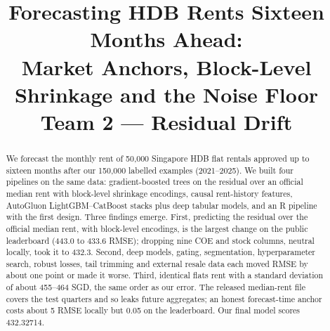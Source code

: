 \documentclass[conference]{IEEEtran}
\newif\ifshowsrc
\newcommand{\src}[1]{\ifshowsrc\textsuperscript{\tiny\color{gray}[#1]}\fi}
\begin{document}
\pagestyle{plain}

\title{Forecasting HDB Rents Sixteen Months Ahead:\\Market Anchors, Block-Level Shrinkage and the Noise Floor\\[2pt]\large Team 2 --- Residual Drift}

\author{}

\maketitle
\thispagestyle{plain}

\begin{abstract}
We forecast the monthly rent of 50,000 Singapore HDB flat rentals approved up to sixteen months after our 150,000 labelled examples (2021--2025). We built four pipelines on the same data: gradient-boosted trees on the residual over an official median rent with block-level shrinkage encodings, causal rent-history features, AutoGluon LightGBM--CatBoost stacks plus deep tabular models, and an R pipeline with the first design. Three findings emerge. First, predicting the residual over the official median rent, with block-level encodings, is the largest change on the public leaderboard (443.0 to 433.6 RMSE); dropping nine COE and stock columns, neutral locally, took it to 432.3. Second, deep models, gating, segmentation, hyperparameter search, robust losses, tail trimming and external resale data each moved RMSE by about one point or made it worse. Third, identical flats rent with a standard deviation of about 455--464 SGD, the same order as our error. The released median-rent file covers the test quarters and so leaks future aggregates; an honest forecast-time anchor costs about 5 RMSE locally but 0.05 on the leaderboard. Our final model scores 432.32714.\src{Aa-lb,Aa-honest-lb,Aa-honest-cost,Aa-coe-lb,Be-noise,Pu-noise,Aa-noise,Me-families}
\end{abstract}
\end{document}
